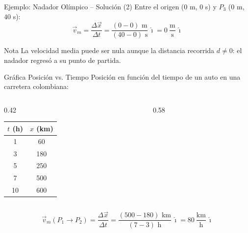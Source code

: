 \documentclass[aspectratio=169,xcolor=dvipsnames]{beamer}
\newcommand{\ii}{\hat{\imath}}
\begin{document}
\begin{frame}{Ejemplo: Nadador Olímpico -- Solución (2)}
Entre el origen ($0$ m, $0$ s) y $P_3$ ($0$ m, $40$ s):
\[
\vec v_m = \frac{\Delta \vec x}{\Delta t} = \frac{(0-0)\text{ m}}{(40-0)\text{ s}}\,\ii = 0\ \frac{\text{m}}{\text{s}}\,\ii
\]
\begin{alertblock}{Nota}
La velocidad media puede ser nula aunque la distancia recorrida $d\neq 0$: el nadador regresó a su punto de partida.
\end{alertblock}
\end{frame}

\begin{frame}{Gráfica Posición vs. Tiempo}
Posición en función del tiempo de un auto en una carretera colombiana:
\begin{columns}
\begin{column}{0.42\textwidth}
\centering
\begin{tabular}{cc}
\toprule
$t$ (h) & $x$ (km) \\ \midrule
1 & 60 \\ 3 & 180 \\ 5 & 250 \\ 7 & 500 \\ 10 & 600 \\ \bottomrule
\end{tabular}
\end{column}
\begin{column}{0.58\textwidth}
\end{column}
\end{columns}
\[
\vec v_m(P_1\to P_2) = \frac{\Delta \vec x}{\Delta t} = \frac{(500-180)\text{ km}}{(7-3)\text{ h}}\,\ii = 80\ \frac{\text{km}}{\text{h}}\,\ii
\]
\end{frame}
\end{document}
